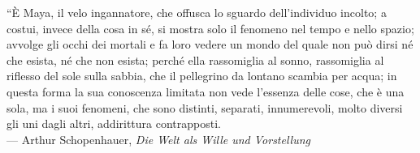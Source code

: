 
\normalsize
“È Maya, il velo ingannatore, che offusca lo sguardo dell’individuo incolto; a costui, invece della cosa in sé, si mostra solo il fenomeno nel tempo e nello spazio; avvolge gli occhi dei mortali e fa loro vedere un mondo del quale non può dirsi né che esista, né che non esista; perché ella rassomiglia al sonno, rassomiglia al riflesso del sole sulla sabbia, che il pellegrino da lontano scambia per acqua; in questa forma la sua conoscenza limitata non vede l’essenza delle cose, che è una sola, ma i suoi fenomeni, che sono distinti, separati, innumerevoli, molto diversi gli uni dagli altri, addirittura contrapposti.\\
\footnotesize
--- Arthur Schopenhauer, \textit{Die Welt als Wille und Vorstellung}\\


\normalsize
